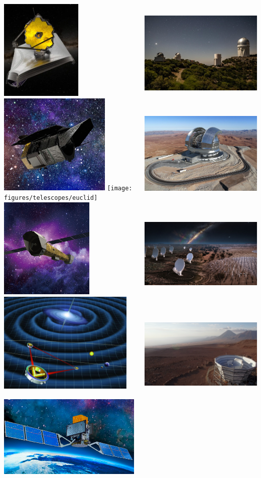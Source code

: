 \documentclass[aspectratio=169,handout]{beamer}
\begin{document}
\begin{frame}
\begin{columns}
        \includegraphics[height=0.15\textwidth]{figures/telescopes/jwst}%
        \includegraphics[height=0.15\textwidth]{figures/telescopes/roman}%
        \texttt{[image: figures/telescopes/euclid]}%
        \includegraphics[height=0.15\textwidth]{figures/telescopes/athena}%
        \includegraphics[height=0.15\textwidth]{figures/telescopes/lisa}%
        \includegraphics[height=0.15\textwidth]{figures/telescopes/e-ASTROGAM}%

        \includegraphics[height=0.16\textwidth]{figures/telescopes/desi}%
        \includegraphics[height=0.16\textwidth]{figures/telescopes/eelt}%
        \includegraphics[height=0.16\textwidth]{figures/telescopes/ska}%
        \includegraphics[height=0.16\textwidth]{figures/telescopes/SO}%


\end{columns}
\end{frame}
\end{document}
